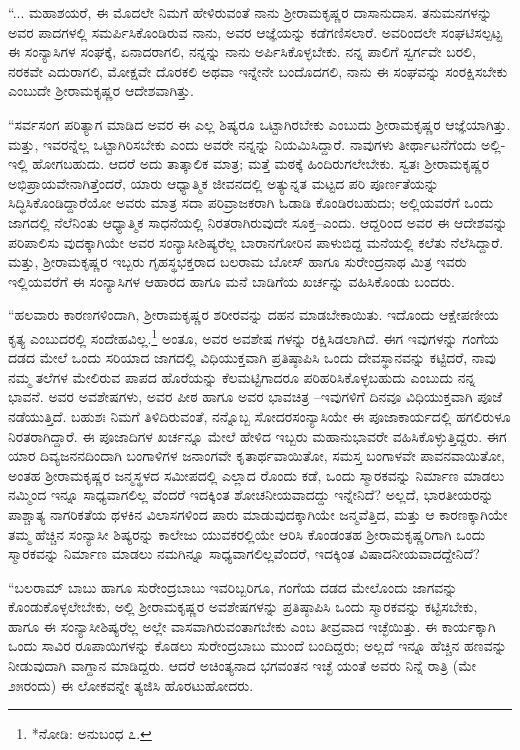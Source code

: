 “... ಮಹಾಶಯರೆ, ಈ ಮೊದಲೇ ನಿಮಗೆ ಹೇಳಿರುವಂತೆ ನಾನು ಶ್ರೀರಾಮಕೃಷ್ಣರ ದಾಸಾನುದಾಸ. ತನುಮನಗಳನ್ನು ಅವರ ಪಾದಗಳಲ್ಲಿ ಸಮರ್ಪಿಸಿಕೊಂಡಿರುವ ನಾನು, ಅವರ ಆಜ್ಞೆಯನ್ನು ಕಡೆಗಣಿಸಲಾರೆ. ಅವರಿಂದಲೇ ಸಂಘಟಿಸಲ್ಪಟ್ಟ ಈ ಸಂನ್ಯಾಸಿಗಳ ಸಂಘಕ್ಕೆ, ಏನಾದರಾಗಲಿ, ನನ್ನನ್ನು ನಾನು ಅರ್ಪಿಸಿಕೊಳ್ಳಬೇಕು. ನನ್ನ ಪಾಲಿಗೆ ಸ್ವರ್ಗವೇ ಬರಲಿ, ನರಕವೇ ಎದುರಾಗಲಿ, ಮೋಕ್ಷವೇ ದೊರಕಲಿ ಅಥವಾ ಇನ್ನೇನೇ ಬಂದೊದಗಲಿ, ನಾನು ಈ ಸಂಘವನ್ನು ಸಂರಕ್ಷಿಸಬೇಕು ಎಂಬುದೇ ಶ್ರೀರಾಮಕೃಷ್ಣರ ಆದೇಶವಾಗಿತ್ತು.

“ಸರ್ವಸಂಗ ಪರಿತ್ಯಾಗ ಮಾಡಿದ ಅವರ ಈ ಎಲ್ಲ ಶಿಷ್ಯರೂ ಒಟ್ಟಾಗಿರಬೇಕು ಎಂಬುದು ಶ್ರೀರಾಮಕೃಷ್ಣರ ಆಜ್ಞೆಯಾಗಿತ್ತು. ಮತ್ತು, ಇವರನ್ನೆಲ್ಲ ಒಟ್ಟಾಗಿರಿಸಬೇಕು ಎಂದು ಅವರೇ ನನ್ನನ್ನು ನಿಯಮಿಸಿದ್ದಾರೆ. ನಾವುಗಳು ತೀರ್ಥಾಟನೆಗೆಂದು ಅಲ್ಲಿ-ಇಲ್ಲಿ ಹೋಗಬಹುದು. ಆದರೆ ಅದು ತಾತ್ಕಾಲಿಕ ಮಾತ್ರ; ಮತ್ತೆ ಮಠಕ್ಕೆ ಹಿಂದಿರುಗಲೇಬೇಕು. ಸ್ವತಃ ಶ್ರೀರಾಮಕೃಷ್ಣರ ಅಭಿಪ್ರಾಯವೇನಾಗಿತ್ತೆಂದರೆ, ಯಾರು ಆಧ್ಯಾತ್ಮಿಕ ಜೀವನದಲ್ಲಿ ಅತ್ಯುನ್ನತ ಮಟ್ಟದ ಪರಿ ಪೂರ್ಣತೆಯನ್ನು ಸಿದ್ಧಿಸಿಕೊಂಡಿದ್ದಾರೆಯೋ ಅವರು ಮಾತ್ರ ಸದಾ ಪರಿವ್ರಾಜಕರಾಗಿ ಓಡಾಡಿ ಕೊಂಡಿರಬಹುದು; ಅಲ್ಲಿಯವರೆಗೆ ಒಂದು ಜಾಗದಲ್ಲಿ ನೆಲೆನಿಂತು ಆಧ್ಯಾತ್ಮಿಕ ಸಾಧನೆಯಲ್ಲಿ ನಿರತರಾಗಿರುವುದೇ ಸೂಕ್ತ–ಎಂದು. ಆದ್ದರಿಂದ ಅವರ ಈ ಆದೇಶವನ್ನು ಪರಿಪಾಲಿಸು ವುದಕ್ಕಾಗಿಯೇ ಅವರ ಸಂನ್ಯಾಸೀಶಿಷ್ಯರೆಲ್ಲ ಬಾರಾನಗೋರಿನ ಪಾಳುಬಿದ್ದ ಮನೆಯಲ್ಲಿ ಕಲೆತು ನೆಲೆಸಿದ್ದಾರೆ. ಮತ್ತು, ಶ್ರೀರಾಮಕೃಷ್ಣರ ಇಬ್ಬರು ಗೃಹಸ್ಥಭಕ್ತರಾದ ಬಲರಾಮ ಬೋಸ್ ಹಾಗೂ ಸುರೇಂದ್ರನಾಥ ಮಿತ್ರ ಇವರು ಇಲ್ಲಿಯವರೆಗೆ ಈ ಸಂನ್ಯಾಸಿಗಳ ಆಹಾರದ ಹಾಗೂ ಮನೆ ಬಾಡಿಗೆಯ ಖರ್ಚನ್ನು ವಹಿಸಿಕೊಂಡು ಬಂದರು.

“ಹಲವಾರು ಕಾರಣಗಳಿಂದಾಗಿ, ಶ್ರೀರಾಮಕೃಷ್ಣರ ಶರೀರವನ್ನು ದಹನ ಮಾಡಬೇಕಾಯಿತು. ಇದೊಂದು ಆಕ್ಷೇಪಣೀಯ ಕೃತ್ಯ ಎಂಬುದರಲ್ಲಿ ಸಂದೇಹವಿಲ್ಲ.\footnote{*ನೋಡಿ: ಅನುಬಂಧ ೭.} ಅಂತೂ, ಅವರ ಅವಶೇಷ ಗಳನ್ನು ರಕ್ಷಿಸಿಡಲಾಗಿದೆ. ಈಗ ಇವುಗಳನ್ನು ಗಂಗೆಯ ದಡದ ಮೇಲೆ ಒಂದು ಸರಿಯಾದ ಜಾಗದಲ್ಲಿ ವಿಧಿಯುಕ್ತವಾಗಿ ಪ್ರತಿಷ್ಠಾಪಿಸಿ ಒಂದು ದೇವಸ್ಥಾನವನ್ನು ಕಟ್ಟಿದರೆ, ನಾವು ನಮ್ಮ ತಲೆಗಳ ಮೇಲಿರುವ ಪಾಪದ ಹೊರೆಯನ್ನು ಕೆಲಮಟ್ಟಿಗಾದರೂ ಪರಿಹರಿಸಿಕೊಳ್ಳಬಹುದು ಎಂಬುದು ನನ್ನ ಭಾವನೆ. ಅವರ ಅವಶೇಷಗಳು, ಅವರ ಪೀಠ ಹಾಗೂ ಅವರ ಭಾವಚಿತ್ರ –ಇವುಗಳಿಗೆ ದಿನವೂ ವಿಧಿಯುಕ್ತವಾಗಿ ಪೂಜೆ ನಡೆಯುತ್ತಿದೆ. ಬಹುಶಃ ನಿಮಗೆ ತಿಳಿದಿರುವಂತೆ, ನನ್ನೊಬ್ಬ ಸೋದರಸಂನ್ಯಾಸಿಯೇ ಈ ಪೂಜಾಕಾರ್ಯದಲ್ಲಿ ಹಗಲಿರುಳೂ ನಿರತರಾಗಿದ್ದಾರೆ. ಈ ಪೂಜಾದಿಗಳ ಖರ್ಚನ್ನೂ ಮೇಲೆ ಹೇಳಿದ ಇಬ್ಬರು ಮಹಾನುಭಾವರೇ ವಹಿಸಿಕೊಳ್ಳುತ್ತಿದ್ದರು. ಈಗ ಯಾರ ದಿವ್ಯಜನನದಿಂದಾಗಿ ಬಂಗಾಳಿಗಳ ಜನಾಂಗವೇ ಕೃತಾರ್ಥವಾಯಿತೋ, ಸಮಸ್ತ ಬಂಗಾಳವೇ ಪಾವನವಾಯಿತೋ, ಅಂತಹ ಶ್ರೀರಾಮಕೃಷ್ಣರ ಜನ್ಮಸ್ಥಳದ ಸಮೀಪದಲ್ಲಿ ಎಲ್ಲಾದ ರೊಂದು ಕಡೆ, ಒಂದು ಸ್ಮಾರಕವನ್ನು ನಿರ್ಮಾಣ ಮಾಡಲು ನಮ್ಮಿಂದ ಇನ್ನೂ ಸಾಧ್ಯವಾಗಲಿಲ್ಲ ವೆಂದರೆ ಇದಕ್ಕಿಂತ ಶೋಚನೀಯವಾದದ್ದು ಇನ್ನೇನಿದೆ? ಅಲ್ಲದೆ, ಭಾರತೀಯರನ್ನು ಪಾಶ್ಚಾತ್ಯ ನಾಗರಿಕತೆಯ ಥಳಕಿನ ವಿಲಾಸಗಳಿಂದ ಪಾರು ಮಾಡುವುದಕ್ಕಾಗಿಯೇ ಜನ್ಮವೆತ್ತಿದ, ಮತ್ತು ಆ ಕಾರಣಕ್ಕಾಗಿಯೇ ತಮ್ಮ ಹೆಚ್ಚಿನ ಸಂನ್ಯಾಸೀ ಶಿಷ್ಯರನ್ನು ಕಾಲೇಜು ಯುವಕರಲ್ಲಿಯೇ ಆರಿಸಿ ಕೊಂಡಂತಹ ಶ್ರೀರಾಮಕೃಷ್ಣರಿಗಾಗಿ ಒಂದು ಸ್ಮಾರಕವನ್ನು ನಿರ್ಮಾಣ ಮಾಡಲು ನಮಗಿನ್ನೂ ಸಾಧ್ಯವಾಗಲಿಲ್ಲವೆಂದರೆ, ಇದಕ್ಕಿಂತ ವಿಷಾದನೀಯವಾದದ್ದೇನಿದೆ?

“ಬಲರಾಮ್ ಬಾಬು ಹಾಗೂ ಸುರೇಂದ್ರಬಾಬು ಇವರಿಬ್ಬರಿಗೂ, ಗಂಗೆಯ ದಡದ ಮೇಲೊಂದು ಜಾಗವನ್ನು ಕೊಂಡುಕೊಳ್ಳಲೇಬೇಕು, ಅಲ್ಲಿ ಶ್ರೀರಾಮಕೃಷ್ಣರ ಅವಶೇಷಗಳನ್ನು ಪ್ರತಿಷ್ಠಾಪಿಸಿ ಒಂದು ಸ್ಮಾರಕವನ್ನು ಕಟ್ಟಿಸಬೇಕು, ಹಾಗೂ ಈ ಸಂನ್ಯಾಸೀಶಿಷ್ಯರೆಲ್ಲ ಅಲ್ಲೇ ವಾಸವಾಗಿರುವಂತಾಗಬೇಕು ಎಂಬ ತೀವ್ರವಾದ ಇಚ್ಛೆಯಿತ್ತು. ಈ ಕಾರ್ಯಕ್ಕಾಗಿ ಒಂದು ಸಾವಿರ ರೂಪಾಯಿಗಳನ್ನು ಕೊಡಲು ಸುರೇಂದ್ರಬಾಬು ಮುಂದೆ ಬಂದಿದ್ದರು; ಅಲ್ಲದೆ ಇನ್ನೂ ಹೆಚ್ಚಿನ ಹಣವನ್ನು ನೀಡುವುದಾಗಿ ವಾಗ್ದಾನ ಮಾಡಿದ್ದರು. ಆದರೆ ಅಚಿಂತ್ಯನಾದ ಭಗವಂತನ ಇಚ್ಛೆ ಯಂತೆ ಅವರು ನಿನ್ನೆ ರಾತ್ರಿ (ಮೇ ೨೫ರಂದು) ಈ ಲೋಕವನ್ನೇ ತ್ಯಜಿಸಿ ಹೊರಟುಹೋದರು.

